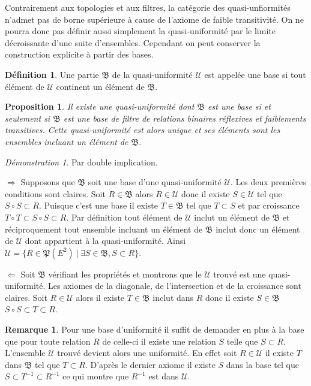 \documentclass[a4paper, 11pt, french]{book}
\newenvironment{itemise}{\itemize}{\enditemize}
\theoremstyle{plain} %
\newtheorem{proposition}{Proposition}
\theoremstyle{definition} %
\newtheorem{definition}{Définition}
\newtheorem{remarque}{Remarque}
\theoremstyle{remark} %
\newtheorem*{demonstration}{Démonstration}
\newcommand{\1}{\mathds{1}}
\newcommand{\inv}[1]{#1^{-1}}
\renewcommand{\frak}[1]{\mathfrak{#1}}
\newcommand{\scr}[1]{\mathscr{#1}}
\newcommand\ens[2]{\{#1 \ |\ #2\}}
\newcommand\equivalence[3]{
	\begin{demonstration}
		#1
		\begin{itemise}
			\item[$\Longrightarrow$] #2
			\item[$\Longleftarrow$] #3
		\end{itemise}
	\end{demonstration}
}
\begin{document}
Contrairement aux topologies et aux filtres, la catégorie des quasi-unfiormités n'admet pas de borne supérieure à cause de l'axiome de faible transitivité.
On ne pourra donc pas définir aussi simplement la quasi-uniformité par le limite décroissante d'une suite d'ensembles.
Cependant on peut conserver la construction explicite à partir des bases.

\begin{definition}
	Une partie $\frak{B}$ de la quasi-uniformité $\scr{U}$ est appelée une base si tout élément de $\scr{U}$ continent un élément de $\frak{B}$.
\end{definition}

\begin{proposition}
	Il existe une quasi-uniformité dont $\frak{B}$ est une base si et seulement si $\frak{B}$ est une base de filtre de relations binaires réflexives et faiblements transitives.
	Cette quasi-uniformité est alors unique et ses éléments sont les ensembles incluant un élément de $\frak{B}$.
\end{proposition}

\equivalence{Par double implication.}{
	Supposons que $\frak{B}$ soit une base d'une quasi-uniformité $\scr{U}$.
	Les deux premières conditions sont claires.
	Soit $R\in\frak{B}$ alors $R\in\scr{U}$ donc il existe $S\in\scr{U}$ tel que $S\circ S\subset R$.
	Puisque c'est une base il existe $T\in\frak{B}$ tel que $T\subset S$ et par croissance $T\circ T\subset S\circ S\subset R$.
	Par définition tout élément de $\scr{U}$ inclut un élément de $\frak{B}$ et réciproquement tout ensemble incluant un élément de $\frak{B}$ inclut donc un élément de $\scr{U}$ dont appartient à la quasi-uniformité.
	Ainsi $\scr{U}=\ens{R\in\frak{P}(E^2)}{\exists S\in\frak{B}, S\subset R}$.
}{
	Soit $\frak{B}$ vérifiant les propriétés et montrons que le $\scr{U}$ trouvé est une quasi-uniformité.
	Les axiomes de la diagonale, de l'intersection et de la croissance sont claires.
	Soit $R\in\scr{U}$ alors il existe $T\in\frak{B}$ inclut dans $R$ donc il existe $S\in\frak{B}$ $S\circ S\subset T\subset R$.
}

\begin{remarque}
	Pour une base d'uniformité il suffit de demander en plus à la base que pour toute relation $R$ de celle-ci il existe une relation $S$ telle que $S\subset R$.
	L'ensemble $\scr{U}$ trouvé devient alors une uniformité.
	En effet soit $R\in\scr{U}$ il existe $T$ dans $\frak{B}$ tel que $T\subset R$.
	D'après le dernier axiome il existe $S$ dans la base tel que $S\subset\inv{T}\subset\inv{R}$ ce qui montre que $\inv{R}$ est dans $\scr{U}$.
\end{remarque}
\end{document}
